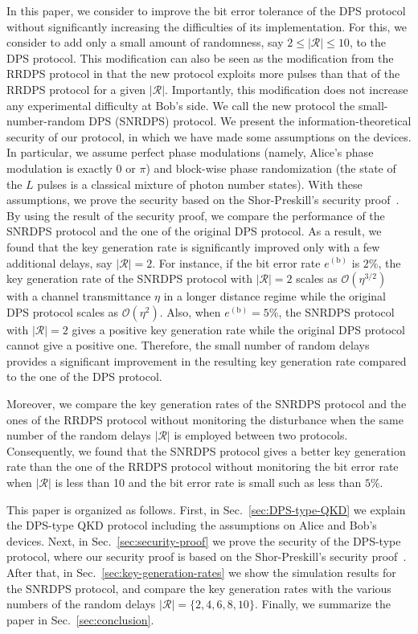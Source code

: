 \documentclass[twocolumn,superscriptaddress,pra,footinbib,notitlepage]{revtex4-1}
\newcommand{\1}{\mbox{1}\hspace{-0.25em}\mbox{l}}
\newcommand{\abs}[1]{\lvert#1\rvert}
\begin{document}
In this paper, we consider to improve the bit error tolerance of the DPS protocol without significantly increasing the difficulties of its implementation.
For this, we consider to add only a small amount of randomness, say $2\leq\abs{\mathcal{R}}\leq10$, to the DPS protocol.
This modification can also be seen as the modification from the RRDPS protocol in that the new protocol exploits more pulses than that of the RRDPS protocol for a given $\abs{\mathcal{R}}$.
Importantly, this modification does not increase any experimental difficulty at Bob's side.
We call the new protocol the small-number-random DPS (SNRDPS) protocol.
We present the information-theoretical security of our protocol, in which we have made some assumptions on the devices. 
In particular, we assume perfect phase modulations (namely, Alice's phase modulation is exactly 0 or $\pi$)
and block-wise phase randomization (the state of the $L$ pulses is a classical mixture of photon number states).
With these assumptions, we prove the security based on the Shor-Preskill's security proof~\cite{shor2000simple}. 
By using the result of the security proof, we compare the performance of the SNRDPS protocol and the one of the original DPS protocol.
As a result, we found that the key generation rate is significantly improved only with a few additional delays, say $\abs{\mathcal{R}}=2$.
For instance, if the bit error rate $e^{(\textrm{b})}$ is $2\%$, the key generation rate of the SNRDPS protocol with $\abs{\mathcal{R}}=2$ scales as $\mathcal{O}(\eta^{3/2})$ with a channel transmittance $\eta$ in a longer distance regime while the original DPS protocol scales as $\mathcal{O}(\eta^2)$.
Also, when $e^{(\textrm{b})}=5\%$, the SNRDPS protocol with $\abs{\mathcal{R}}=2$ gives a positive key generation rate while the original DPS protocol cannot give a positive one. 
Therefore, the small number of random delays provides a significant improvement in the resulting key generation rate compared to the one of the DPS protocol.

Moreover, we compare the key generation rates of the SNRDPS protocol and the ones of the RRDPS protocol without monitoring the disturbance when the same number of the random delays $\abs{\mathcal{R}}$ is employed between two protocols.
Consequently, we found that the SNRDPS protocol gives a better key generation rate than the one of the RRDPS protocol without monitoring the bit error rate when $\abs{\mathcal{R}}$ is less than 10 and the bit error rate is small such as less than $5\%$.

This paper is organized as follows.
First, in Sec.~\ref{sec:DPS-type-QKD} we explain the DPS-type QKD protocol including the assumptions on Alice and Bob's devices.
Next, in Sec.~\ref{sec:security-proof} we prove the security of the DPS-type protocol, where our security proof is based on the Shor-Preskill's security proof~\cite{shor2000simple}.
After that, in Sec.~\ref{sec:key-generation-rates} we show the simulation results for the SNRDPS protocol, and compare the key generation rates with the various numbers of the random delays $\abs{\mathcal{R}}=\{2, 4, 6, 8, 10\}$.
Finally, we summarize the paper in Sec.~\ref{sec:conclusion}. 
\end{document}
